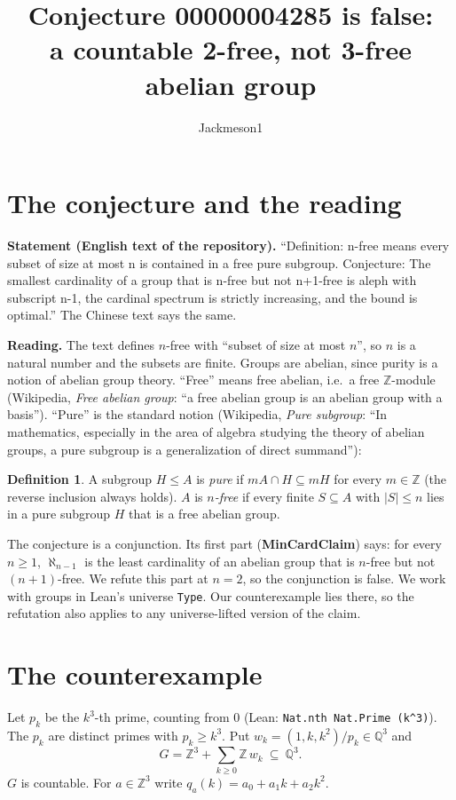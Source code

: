 \documentclass[11pt]{article}
\title{Conjecture 00000004285 is false:\\ a countable 2-free, not 3-free abelian group}
\author{Jackmeson1}
\date{}
\theoremstyle{definition}
\newtheorem{definition}[theorem]{Definition}
\begin{document}
\maketitle

\section{The conjecture and the reading}
\textbf{Statement (English text of the repository).} ``Definition: n-free means every subset of
size at most n is contained in a free pure subgroup. Conjecture: The smallest cardinality of a group
that is n-free but not n+1-free is aleph with subscript n-1, the cardinal spectrum is strictly
increasing, and the bound is optimal.'' The Chinese text says the same.

\textbf{Reading.} The text defines $n$-free with ``subset of size at most $n$'', so $n$ is a natural
number and the subsets are finite. Groups are abelian, since purity is a notion of abelian group
theory. ``Free'' means free abelian, i.e.\ a free $\mathbb Z$-module (Wikipedia, \emph{Free abelian
group}: ``a free abelian group is an abelian group with a basis''). ``Pure'' is the standard notion
(Wikipedia, \emph{Pure subgroup}: ``In mathematics, especially in the area of algebra studying the
theory of abelian groups, a pure subgroup is a generalization of direct summand''):

\begin{definition}
A subgroup $H\le A$ is \emph{pure} if $mA\cap H\subseteq mH$ for every $m\in\mathbb Z$ (the reverse
inclusion always holds). $A$ is \emph{$n$-free} if every finite $S\subseteq A$ with $|S|\le n$ lies
in a pure subgroup $H$ that is a free abelian group.
\end{definition}

The conjecture is a conjunction. Its first part (\textbf{MinCardClaim}) says: for every $n\ge1$,
$\aleph_{n-1}$ is the least cardinality of an abelian group that is $n$-free but not $(n+1)$-free.
We refute this part at $n=2$, so the conjunction is false. We work with groups in Lean's universe
\texttt{Type}. Our counterexample lies there, so the refutation also applies to any universe-lifted
version of the claim.

\section{The counterexample}
Let $p_k$ be the $k^3$-th prime, counting from $0$ (Lean: \texttt{Nat.nth Nat.Prime (k\^{}3)}). The
$p_k$ are distinct primes with $p_k\ge k^3$. Put $w_k=(1,k,k^2)/p_k\in\mathbb Q^3$ and
\[ G=\mathbb Z^3+\textstyle\sum_{k\ge0}\mathbb Z\,w_k\ \subseteq\ \mathbb Q^3 . \]
$G$ is countable. For $a\in\mathbb Z^3$ write $q_a(k)=a_0+a_1k+a_2k^2$.
\end{document}
